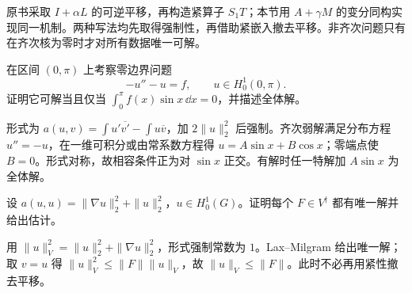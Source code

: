 原书采取 $I+\alpha L$ 的可逆平移，再构造紧算子 $S_1T$；本节用 $A+\gamma M$ 的变分同构实现同一机制。两种写法均先取得强制性，再借助紧嵌入撤去平移。非齐次问题只有在齐次核为零时才对所有数据唯一可解。

\begin{exercise}[区间上的共振]\label{ex:y10-dirichlet-resonance}
在区间 $(0,\pi)$ 上考察零边界问题
\[
 -u''-u=f,\qquad u\in H_0^1(0,\pi).
\]
证明它可解当且仅当 $\int_0^\pi f(x)\sin x\,\dd x=0$，并描述全体解。
\end{exercise}
\begin{solution}
形式为 $a(u,v)=\int u'\overline{v'}-\int u\overline v$，加 $2\|u\|_2^2$ 后强制。齐次弱解满足分布方程 $u''=-u$，在一维可积分或由常系数方程得 $u=A\sin x+B\cos x$；零端点使 $B=0$。形式对称，故相容条件正为对 $\sin x$ 正交。有解时任一特解加 $A\sin x$ 为全体解。
\end{solution}

\begin{exercise}[强制情形没有共振]\label{ex:y10-coercive}
设 $a(u,u)=\|\nabla u\|_2^2+\|u\|_2^2$，$u\in H_0^1(G)$。证明每个 $F\in V^\dagger$ 都有唯一解并给出估计。
\end{exercise}
\begin{solution}
用 $\|u\|_V^2=\|u\|_2^2+\|\nabla u\|_2^2$，形式强制常数为 $1$。Lax--Milgram 给出唯一解；取 $v=u$ 得 $\|u\|_V^2\le\|F\|\|u\|_V$，故 $\|u\|_V\le\|F\|$。此时不必再用紧性撤去平移。
\end{solution}
